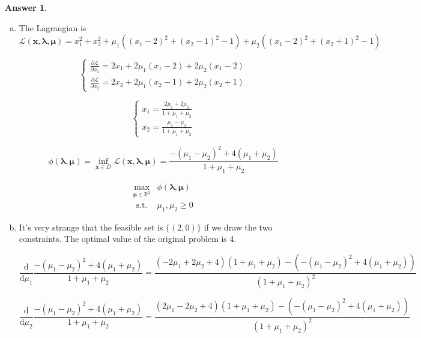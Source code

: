 \documentclass{article}
\theoremstyle{definition}
\newtheorem{ans}{Answer}
\begin{document}
	\begin{ans}
		~

		\begin{enumerate}[(a)]
			\item The Lagrangian is 
			$$
			\mathcal{L}(\boldsymbol{x}, \boldsymbol{\lambda}, \boldsymbol{\mu})=x_{1}^{2}+x_{2}^{2} + \mu_1(\left(x_{1}-2\right)^{2}+\left(x_{2}-1\right)^{2}-1)+\mu_2(\left(x_{1}-2\right)^{2}+\left(x_{2}+1\right)^{2}-1)
			$$
			
			$$
			\left\{\begin{array}{l}
				\frac{\partial \mathcal{L}}{\partial x_1}=2 x_1+2 \mu_1\left(x_1-2\right)+2 \mu_2\left(x_1-2\right) \\
				\frac{\partial \mathcal{L}}{\partial x_2}=2 x_2+2 \mu_1\left(x_2-1\right)+2 \mu_2\left(x_2+1\right)
			\end{array}\right. 
			$$
			
			$$
			\left\{\begin{array}{l}
				x_1=\frac{2 \mu_1+2 \mu_2}{1+\mu_1+\mu_2} \\
				x_2=\frac{\mu_1-\mu_2}{1+\mu_1+\mu_2}
			\end{array}\right.
			$$
			
			$$
			\phi(\boldsymbol{\lambda}, \boldsymbol{\mu})=\inf _{\boldsymbol{x} \in D} \mathcal{L}(\boldsymbol{x}, \boldsymbol{\lambda}, \boldsymbol{\mu})=\frac{-\left(\mu_1-\mu_2\right)^2+4\left(\mu_1+\mu_2\right)}{1+\mu_1+\mu_2}
			$$	
					
			$$
			\begin{aligned}
				\max_{\boldsymbol{{\mu}} \in \mathbb{R}^2} & \phi(\boldsymbol{\lambda}, \boldsymbol{\mu}) \\
				\text { s.t. } & \mu_1, \mu_2 \geq 0
			\end{aligned}
			$$
			
			\item It's very strange that the feasible set is $\{(2,0)\}$ if we draw the two constraints. The optimal value of the original problem is 4. 
			
			$$\frac{\mathrm{d}}{\mathrm{d}\mu_1}\frac{-\left(\mu_1-\mu_2\right)^2+4\left(\mu_1+\mu_2\right)}{1+\mu_1+\mu_2} = \frac{\left(-2\mu_1+2\mu_2+4\right)\left(1+\mu_1+\mu_2\right)-\left(-\left(\mu_1-\mu_2\right)^2+4\left(\mu_1+\mu_2\right)\right)}{\left(1+\mu_1+\mu_2\right)^2}$$
			
			$$\frac{\mathrm{d}}{\mathrm{d}\mu_2}\frac{-\left(\mu_1-\mu_2\right)^2+4\left(\mu_1+\mu_2\right)}{1+\mu_1+\mu_2} = \frac{\left(2\mu_1-2\mu_2+4\right)\left(1+\mu_1+\mu_2\right)-\left(-\left(\mu_1-\mu_2\right)^2+4\left(\mu_1+\mu_2\right)\right)}{\left(1+\mu_1+\mu_2\right)^2}$$
			

\end{enumerate}
\end{ans}
\end{document}
